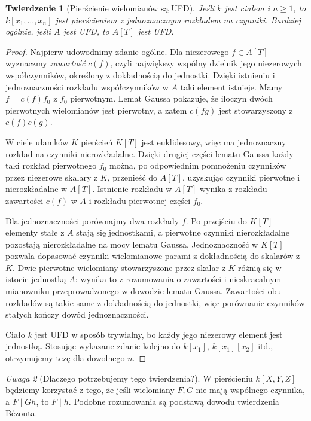 \documentclass[11pt,a4paper,openany]{report}
\numberwithin{equation}{section}
\theoremstyle{plain}
\newtheorem{twierdzenie}{Twierdzenie}[section]
\theoremstyle{definition}
\theoremstyle{remark}
\newtheorem{uwaga}[twierdzenie]{Uwaga}
\begin{document}
\begin{twierdzenie}[Pierścienie wielomianów są UFD]
\label{tw:polynomial-UFD}
Jeśli $k$ jest ciałem i $n\ge1$, to
$k[x_1,\dots,x_n]$ jest pierścieniem z jednoznacznym
rozkładem na czynniki. Bardziej ogólnie, jeśli $A$
jest UFD, to $A[T]$ jest UFD.
\end{twierdzenie}
\begin{proof}
Najpierw udowodnimy zdanie ogólne. Dla niezerowego
$f\in A[T]$ wyznaczmy \emph{zawartość} $c(f)$, czyli
największy wspólny dzielnik jego niezerowych współczynników,
określony z dokładnością do jednostki. Dzięki istnieniu
i jednoznaczności rozkładu współczynników w $A$ taki
element istnieje. Mamy $f=c(f)f_0$ z $f_0$ pierwotnym.
Lemat Gaussa pokazuje, że iloczyn dwóch pierwotnych
wielomianów jest pierwotny, a zatem
$c(fg)$ jest stowarzyszony z $c(f)c(g)$.

W ciele ułamków $K$ pierścień $K[T]$ jest euklidesowy,
więc ma jednoznaczny rozkład na czynniki nierozkładalne.
Dzięki drugiej części lematu Gaussa każdy taki rozkład
pierwotnego $f_0$ można, po odpowiednim pomnożeniu
czynników przez niezerowe skalary z $K$, przenieść do
$A[T]$, uzyskując czynniki pierwotne i nierozkładalne
w $A[T]$. Istnienie rozkładu w $A[T]$ wynika z rozkładu
zawartości $c(f)$ w $A$ i rozkładu pierwotnej części $f_0$.

Dla jednoznaczności porównajmy dwa rozkłady $f$.
Po przejściu do $K[T]$ elementy stałe z $A$ stają się
jednostkami, a pierwotne czynniki nierozkładalne
pozostają nierozkładalne na mocy lematu Gaussa.
Jednoznaczność w $K[T]$ pozwala dopasować czynniki
wielomianowe parami z dokładnością do skalarów z $K$.
Dwie pierwotne wielomiany stowarzyszone przez skalar
z $K$ różnią się w istocie jednostką $A$:
wynika to z rozumowania o zawartości i nieskracalnym
mianowniku przeprowadzonego w dowodzie lematu Gaussa.
Zawartości obu rozkładów są takie same z dokładnością
do jednostki, więc porównanie czynników stałych kończy
dowód jednoznaczności.

Ciało $k$ jest UFD w sposób trywialny, bo każdy jego
niezerowy element jest jednostką. Stosując wykazane
zdanie kolejno do $k[x_1]$, $k[x_1][x_2]$ itd.,
otrzymujemy tezę dla dowolnego $n$.
\end{proof}

\begin{uwaga}[Dlaczego potrzebujemy tego twierdzenia?]
W pierścieniu $k[X,Y,Z]$ będziemy korzystać z tego,
że jeśli wielomiany $F,G$ nie mają wspólnego czynnika,
a $F\mid Gh$, to $F\mid h$. Podobne rozumowania
są podstawą dowodu twierdzenia Bézouta.
\end{uwaga}
\end{document}
